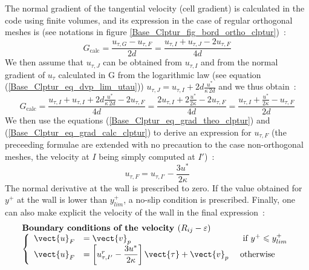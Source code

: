The normal gradient of the tangential velocity (cell gradient) is
calculated in the code using finite volumes, and its expression in the case
of regular orthogonal meshes is (see notations in figure
\ref{Base_Clptur_fig_bord_ortho_clptur})~:
\begin{equation}
G_{\text{calc}}=\displaystyle\frac{u_{\tau,G}-u_{\tau,F}}{2d} =
\displaystyle\frac{u_{\tau,I}+u_{\tau,J}-2u_{\tau,F}}{4d}
\end{equation}
We then assume that $u_{\tau,J}$ can be obtained from $u_{\tau,I}$
and from the normal gradient of $u_{\tau}$ calculated in G
from the logarithmic law (see equation (\ref{Base_Clptur_eq_dvp_lim_utau}))
$u_{\tau,J}=u_{\tau,I}+2d\displaystyle\frac{u^*}{\kappa\, 2d}$ and we thus
obtain~:
\begin{equation}\label{Base_Clptur_eq_grad_calc_clptur}
G_{\text{calc}}=\displaystyle\frac{u_{\tau,I}+u_{\tau,I}+2d\displaystyle\frac{u^*}{\kappa\, 2d}-2u_{\tau,F}}{4d}=
\displaystyle\frac{2u_{\tau,I}+2\displaystyle\frac{u^*}{2\kappa}-2u_{\tau,F}}{4d}=
\displaystyle\frac{u_{\tau,I}+\displaystyle\frac{u^*}{2\kappa}-u_{\tau,F}}{2d}
\end{equation}
We then use the equations (\ref{Base_Clptur_eq_grad_theo_clptur}) and
(\ref{Base_Clptur_eq_grad_calc_clptur}) to derive an expression for
$u_{\tau,F}$ (the preceeding
formulae are extended with no precaution to the case non-orthogonal meshes,
the velocity at $I$ being simply computed at $I'$)~:
\begin{equation}
u_{\tau,F}= u_{\tau,I'}-\displaystyle\frac{3u^*}{2\kappa }
\end{equation}
The normal derivative at the wall is prescribed to zero.
If the value obtained for $y^+$ at the wall is lower than  $y^+_{lim}$,
a no-slip condition is prescribed. Finally, one can also
make explicit the velocity of the wall in the final expression~:
\begin{equation}\label{Base_Clptur_eq_CL_vitesse_rij_clptur}
\begin{array}{l}
\text{\bf Boundary conditions of the velocity }(R_{ij}-\varepsilon)\\
\left\{\begin{array}{lll}
\vect{u}_{F}&=\vect{v}_p& \text{ \ if\ } y^+\leqslant
                           y^+_{lim} \\
\vect{u}_{F}&=\left[u^r_{\tau,I'}-\displaystyle\frac{3u^*}{2\kappa } \right]\vect{\tau} +\vect{v}_p &\text{ otherwise }
\end{array}\right.
\end{array}
\end{equation}


